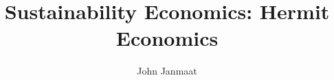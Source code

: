 \documentclass[10pt, aspectratio=169]{beamer}
\title{Sustainability Economics: Hermit Economics}
\author{John Janmaat}
\begin{document}
	
	\frame{\titlepage}
	
	
	
\end{document}
